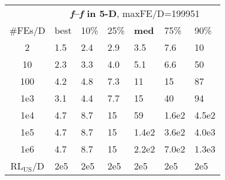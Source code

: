 \begin{tabular}{c|llllll}
 & \multicolumn{6}{|c}{\textbf{\textit{f}\raisebox{-0.35ex}{1}--\textit{f}\raisebox{-0.35ex}{24} in 5-D}, maxFE/D=199951}\\
\#FEs/D & best & 10\% & 25\% & \textbf{med} & 75\% & 90\%\\
2 & \hspace*{1ex}1.5 & \hspace*{1ex}2.4 & \hspace*{1ex}2.9 & \hspace*{1ex}3.5 & \hspace*{1ex}7.6 & 10\\
10 & \hspace*{1ex}2.3 & \hspace*{1ex}3.3 & \hspace*{1ex}4.0 & \hspace*{1ex}5.1 & \hspace*{1ex}6.6 & 50\\
100 & \hspace*{1ex}4.2 & \hspace*{1ex}4.8 & \hspace*{1ex}7.3 & 11 & 15 & 87\\
1e3 & \hspace*{1ex}3.1 & \hspace*{1ex}4.4 & \hspace*{1ex}7.7 & 15 & 40 & 94\\
1e4 & \hspace*{1ex}4.7 & \hspace*{1ex}8.7 & 15 & 59 & 1.6e2 & 4.5e2\\
1e5 & \hspace*{1ex}4.7 & \hspace*{1ex}8.7 & 15 & 1.4e2 & 3.6e2 & 4.0e3\\
1e6 & \hspace*{1ex}4.7 & \hspace*{1ex}8.7 & 15 & 2.2e2 & 7.0e2 & 1.3e3\\
$\text{RL}_{\text{US}}$/D & 2e5 & 2e5 & 2e5 & 2e5 & 2e5 & 2e5
\end{tabular}
